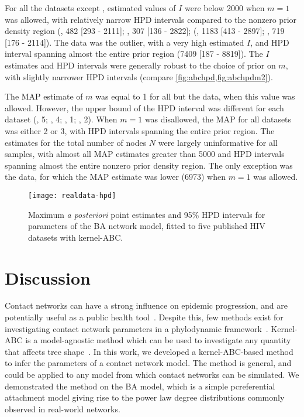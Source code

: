 \documentclass[12pt]{article}\usepackage[]{graphicx}\usepackage[]{color}
\begin{document}
For all the datasets except \citeauthor{novitsky2014impact}, estimated values
of $I$ were below 2000 when $m = 1$ was allowed, with relatively narrow HPD
intervals compared to the nonzero prior density region
  (\citeauthor{cuevas2009hiv}, 482 
  [293 -
   2111];
   \citeauthor{niculescu2015recent}, 307
  [136 - 
   2822];
  (\citeauthor{li2015hiv}, 1183 
  [413 -
   2897];
   \citeauthor{wang2015targeting}, 719
  [176 - 
   2114]).
The \citeauthor{novitsky2014impact} data was the outlier, with a very high
estimated $I$, and HPD interval spanning almost the entire prior region
  (7409 
  [187 -
   8819]).
The $I$ estimates and HPD intervals were generally robust to the choice of
prior on $m$, with slightly narrower HPD intervals (compare
\cref{fig:abchpd,fig:abchpdm2}).

The MAP estimate of $m$ was equal to 1 for all but the
\citeauthor{novitsky2014impact} data, when this value was allowed. However, the
upper bound of the HPD interval was different for each dataset
  (\citeauthor{niculescu2015recent}, 5;
   \citeauthor{wang2015targeting}, 4;
   \citeauthor{li2015hiv}, 1;
   \citeauthor{cuevas2009hiv}, 2).
When $m = 1$ was disallowed, the MAP for all datasets was either 2 or 3, with
HPD intervals spanning the entire prior region. The estimates for the total
number of nodes $N$ were largely uninformative for all samples, with almost all
MAP estimates greater than 5000 and HPD intervals spanning almost the entire
nonzero prior density region. The only exception was the \citeauthor{li2015hiv}
data, for which the MAP estimate was lower 
  (6973)
when $m = 1$ was allowed.

\begin{figure*}[ht]
  \centering
  \texttt{[image: realdata-hpd]}
  \vspace{8pt}
  \caption{
      Maximum \textit{a posteriori} point estimates and 95\% HPD intervals for
      parameters of the BA network model, fitted to five published HIV datasets
      with kernel-ABC.
  }
  \label{fig:abchpd}
\end{figure*}

\section{Discussion}

Contact networks can have a strong influence on epidemic progression, and are
potentially useful as a public health tool~\autocite{wang2015targeting,
little2014using}. Despite this, few methods exist for investigating contact
network parameters in a phylodynamic framework~\autocite{groendyke2011bayesian,
volz2008sir, brown2011transmission, leventhal2012inferring}. Kernel-ABC is a
model-agnostic method which can be used to investigate any quantity that
affects tree shape~\autocite{poon2015phylodynamic}. In this work, we developed a
kernel-ABC-based method to infer the parameters of a contact network model. The
method is general, and could be applied to any model from which contact
networks can be simulated. We demonstrated the method on the BA model,
which is a simple pcreferential attachment model giving rise to the power law
degree distributions commonly observed in real-world networks. 
\end{document}
